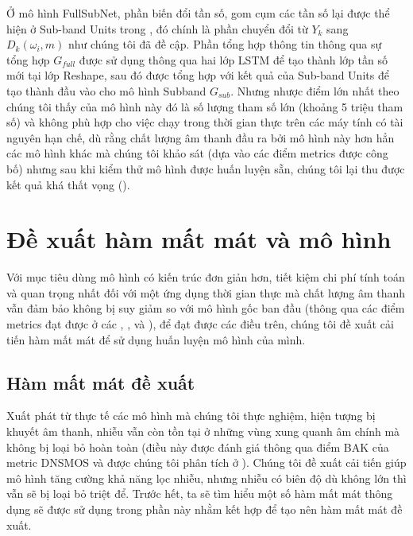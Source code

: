 			 Ở mô hình FullSubNet, phần biến đổi tần số, gom cụm các tần số lại được thể hiện ở Sub-band Units trong , đó chính là phần chuyển đổi từ $Y_k$ sang $D_k(\omega_i, m)$ như chúng tôi đã đề cập. Phần tổng hợp thông tin thông qua sự tổng hợp \spectrogram{} $G_{full}$ được sử dụng thông qua hai lớp LSTM để tạo thành lớp tần số mới tại lớp Reshape, sau đó được tổng hợp với kết quả của Sub-band Units để tạo thành đầu vào cho mô hình Subband $G_{sub}$. Nhưng nhược điểm lớn nhất theo chúng tôi thấy của mô hình này đó là số lượng tham số lớn (khoảng 5 triệu tham số) và không phù hợp cho việc chạy trong thời gian thực trên các máy tính có tài nguyên hạn chế, dù rằng chất lượng âm thanh đầu ra bởi mô hình này hơn hẳn các mô hình khác mà chúng tôi khảo sát (dựa vào các điểm metrics được công bố) nhưng sau khi kiểm thử mô hình được huấn luyện sẵn, chúng tôi lại thu được kết quả khá thất vọng (). %
		
		
		
			

\section{Đề xuất hàm mất mát và mô hình} \label{section::relatedworks::propose}

	Với mục tiêu dùng mô hình có kiến trúc đơn giản hơn, tiết kiệm chi phí tính toán và quan trọng nhất đối với một ứng dụng thời gian thực mà chất lượng âm thanh vẫn đảm bảo không bị suy giảm so với mô hình gốc ban đầu (thông qua các điểm metrics đạt được ở các , ,  và ), để đạt được các điều trên, chúng tôi đề xuất cải tiến hàm mất mát để sử dụng huấn luyện mô hình của mình.
	
	\subsection{Hàm mất mát đề xuất}
		
		Xuất phát từ thực tế các mô hình mà chúng tôi thực nghiệm, hiện tượng bị khuyết âm thanh, nhiễu vẫn còn tồn tại ở những vùng xung quanh âm chính mà không bị loại bỏ hoàn toàn (điều này được đánh giá thông qua điểm BAK của metric DNSMOS và được chúng tôi phân tích ở ). Chúng tôi đề xuất cải tiến giúp mô hình tăng cường khả năng lọc nhiễu, nhưng nhiễu có biên độ dù không lớn thì vẫn sẽ bị loại bỏ triệt để. Trước hết, ta sẽ tìm hiểu một số hàm mất mát thông dụng sẽ được sử dụng trong phần này nhằm kết hợp để tạo nên hàm mất mát đề xuất.
		
